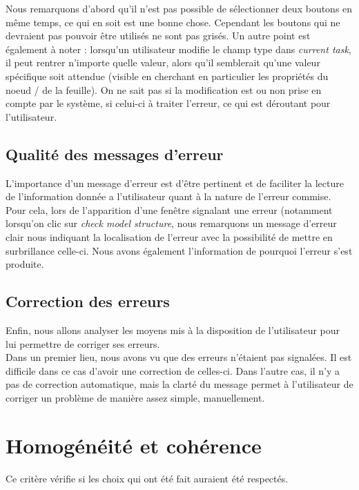 \documentclass[12pt, a4paper]{article}
\begin{document}
Nous remarquons d'abord qu'il n'est pas possible de sélectionner deux boutons en même temps, ce qui en soit est une bonne chose. Cependant les boutons qui ne devraient pas pouvoir être utilisés ne sont pas grisés. Un autre point est également à noter : lorsqu'un utilisateur modifie le champ type dans \emph{current task}, il peut rentrer n'importe quelle valeur, alors qu'il semblerait qu'une valeur spécifique soit attendue (visible en cherchant en particulier les propriétés du noeud / de la feuille). On ne sait pas si la modification est ou non prise en compte par le système, si celui-ci à traiter l'erreur, ce qui est déroutant pour l'utilisateur.

\subsection{Qualité des messages d'erreur}
L'importance d'un message d'erreur est d'être pertinent et de faciliter la lecture de l'information donnée a l'utilisateur quant à la nature de l'erreur commise.\\


Pour cela, lors de l'apparition d'une fenêtre signalant une erreur (notamment lorsqu'on clic sur \emph{check model structure}, nous remarquons un message d'erreur clair nous indiquant la localisation de l'erreur avec la possibilité de mettre en surbrillance celle-ci. Nous avons également l'information de pourquoi l'erreur s'est produite. %

\subsection{Correction des erreurs}
Enfin, nous allons analyser les moyens mis à la disposition de l'utilisateur pour lui permettre de corriger ses erreurs.\\


Dans un premier lieu, nous avons vu que des erreurs n'étaient pas signalées. Il est difficile dans ce cas d'avoir une correction de celles-ci. Dans l'autre cas, il n'y a pas de correction automatique, mais la clarté du message permet à l'utilisateur de corriger un problème de manière assez simple, manuellement.
\section{Homogénéité et cohérence}
Ce critère vérifie si les choix qui ont été fait auraient été respectés.\\
\end{document}
